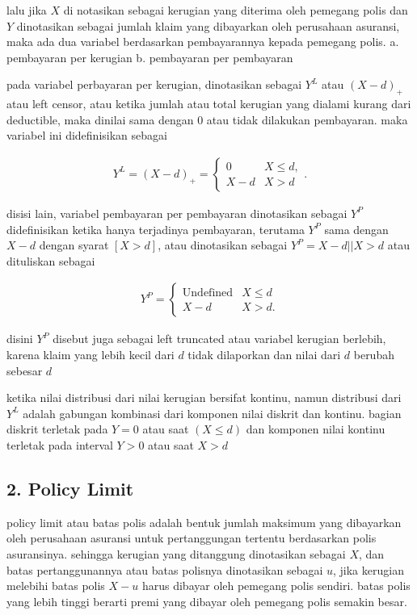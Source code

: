 \documentclass[
]{book}
\begin{document}
lalu jika \(X\) di notasikan sebagai kerugian yang diterima oleh pemegang polis dan \(Y\) dinotasikan sebagai jumlah klaim yang dibayarkan oleh perusahaan asuransi, maka ada dua variabel berdasarkan pembayarannya kepada pemegang polis.
a. pembayaran per kerugian
b. pembayaran per pembayaran

pada variabel perbayaran per kerugian, dinotasikan sebagai \(Y^L\) atau \((X-d)_+\) atau left censor, atau ketika jumlah atau total kerugian yang dialami kurang dari deductible, maka dinilai sama dengan 0 atau tidak dilakukan pembayaran. maka variabel ini didefinisikan sebagai

\begin{align*}
Y^{L} = \left( X - d \right)_{+} 
= \left\{ \begin{array}{cc}
0 & X \le d, \\
X - d & X > d  
\end{array} \right. .
\end{align*}

disisi lain, variabel pembayaran per pembayaran dinotasikan sebagai \(Y^P\) didefinisikan ketika hanya terjadinya pembayaran, terutama \(Y^P\) sama dengan \(X-d\) dengan syarat \([X>d]\), atau dinotasikan sebagai \(Y^P=X-d||X>d\) atau dituliskan sebagai

\begin{align*}
Y^{P} = \left\{ \begin{matrix}
\text{Undefined} & X \le d \\
X - d & X > d .
\end{matrix}  \right.
\end{align*}

disini \(Y^P\) disebut juga sebagai left truncated atau variabel kerugian berlebih, karena klaim yang lebih kecil dari \(d\) tidak dilaporkan dan nilai dari \(d\) berubah sebesar \(d\)

ketika nilai distribusi dari nilai kerugian bersifat kontinu, namun distribusi dari \(Y^L\) adalah gabungan kombinasi dari komponen nilai diskrit dan kontinu. bagian diskrit terletak pada \(Y=0\) atau saat \((X \leq d)\) dan komponen nilai kontinu terletak pada interval \(Y>0\) atau saat \(X>d\)

\hypertarget{policy-limit}{%
\subsection{2. Policy Limit}\label{policy-limit}}

policy limit atau batas polis adalah bentuk jumlah maksimum yang dibayarkan oleh perusahaan asuransi untuk pertanggungan tertentu berdasarkan polis asuransinya. sehingga kerugian yang ditanggung dinotasikan sebagai \(X\), dan batas pertanggunannya atau batas polisnya dinotasikan sebagai \(u\), jika kerugian melebihi batas polis \(X-u\) harus dibayar oleh pemegang polis sendiri. batas polis yang lebih tinggi berarti premi yang dibayar oleh pemegang polis semakin besar.
\end{document}
